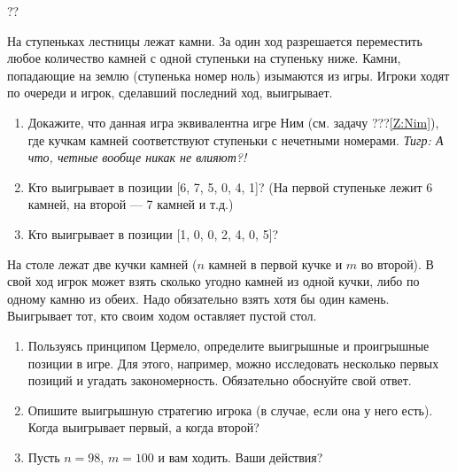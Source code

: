 \begin{problem}\par
\begin{source} \cite{sprague:uz}??\end{source}
На ступеньках лестницы лежат камни. За один ход разрешается переместить любое количество камней с одной ступеньки на ступеньку ниже. Камни, попадающие на землю (ступенька номер ноль) изымаются из игры. Игроки ходят по очереди и игрок, сделавший последний ход, выигрывает.\par
\begin{enumerate}
\item 	Докажите, что данная игра эквивалентна игре Ним (см. задачу  {\red ???}\ref{Z:Nim}), где кучкам камней соответствуют ступеньки с нечетными номерами. {\it Тигр: А что, четные вообще никак не влияют?!}\par
\item 	Кто выигрывает в позиции [6, 7, 5, 0, 4, 1]? (На первой ступеньке лежит 6 камней, на второй --- 7 камней и т.д.)\par
\item 	Кто выигрывает в позиции [1, 0, 0, 2, 4, 0, 5]?\par
\end{enumerate}


\begin{sol}

\end{sol}
\end{problem}

\begin{problem}
\begin{source}
\cite{savva:nmu}
\end{source}
  На столе лежат две кучки камней ($n$ камней в первой кучке и $m$ во второй). В свой ход игрок может взять сколько угодно камней из одной кучки, либо по одному камню из обеих. Надо обязательно взять хотя бы один камень. Выигрывает тот, кто своим ходом оставляет пустой стол.
\begin{enumerate}
\item Пользуясь принципом Цермело, определите выигрышные и проигрышные позиции в игре. Для этого, например, можно исследовать несколько первых позиций и угадать закономерность. Обязательно обоснуйте свой ответ.
\item Опишите выигрышную стратегию игрока (в случае, если она у него есть). Когда выигрывает первый, а когда второй?
\item Пусть $n = 98$, $m=100$ и вам ходить. Ваши действия?
\end{enumerate}






\begin{sol}

\end{sol}
\end{problem}



